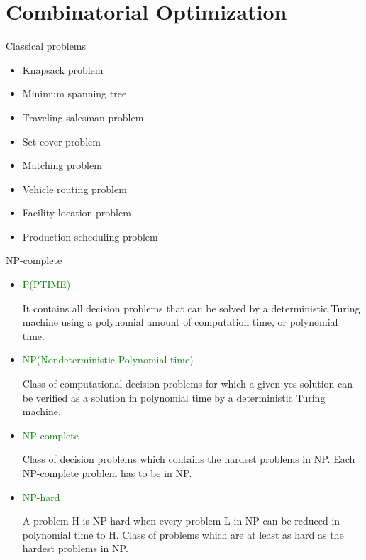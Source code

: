 \section{Combinatorial Optimization}

    \frame{\sectionpage}

    \begin{frame}{Classical problems}
      \large
      \begin{spacing}{1.5}
      \begin{itemize}
        \item Knapsack problem
        \item Minimum spanning tree
        \item Traveling salesman problem
        \item Set cover problem
        \item Matching problem
        \item Vehicle routing problem
        \item Facility location problem
        \item Production scheduling problem
      \end{itemize}
      \end{spacing}
   \end{frame}

   \begin{frame}{NP-complete}
     \begin{itemize}
       \item \textcolor{green}{P(PTIME)}

       It contains all decision problems that can be solved by a deterministic Turing machine using a polynomial amount of computation time, or polynomial time.
       \item \textcolor{green}{NP(Nondeterministic Polynomial time)}

       Class of computational decision problems for which a given yes-solution can be verified as a solution in polynomial time by a deterministic Turing machine.
       \item \textcolor{green}{NP-complete}

       Class of decision problems which contains the hardest problems in NP. Each NP-complete problem has to be in NP.
       \item \textcolor{green}{NP-hard}

       A problem H is NP-hard when every problem L in NP can be reduced in polynomial time to H.
       Class of problems which are at least as hard as the hardest problems in NP.
     \end{itemize}

   \end{frame}


